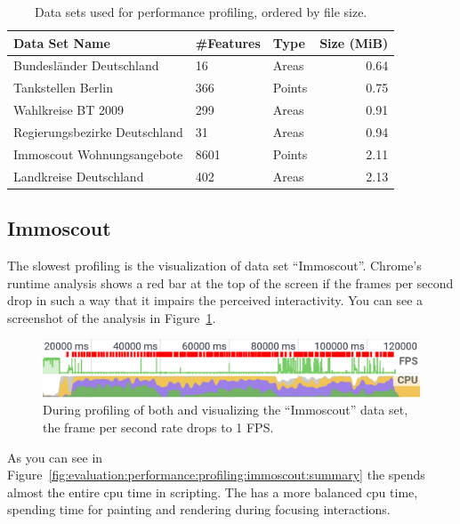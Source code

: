 \begin{table}[ht]
  \centering
  \caption{Data sets used for performance profiling, ordered by file size.}%
  \label{tab:evaluation:performance:data-sets}
  \begin{tabular}{lllr}
    Data Set Name & \#Features & Type & Size (MiB) \\
    \hline
    Bundesländer Deutschland      & 16   & Areas  & 0.64 \\
    Tankstellen Berlin            & 366  & Points & 0.75 \\
    Wahlkreise BT 2009            & 299  & Areas  & 0.91 \\
    Regierungsbezirke Deutschland & 31   & Areas  & 0.94 \\
    Immoscout Wohnungsangebote    & 8601 & Points & 2.11 \\
    Landkreise Deutschland        & 402  & Areas  & 2.13 \\
  \end{tabular}
\end{table}


\subsection{Immoscout}
The slowest profiling is the visualization of data set ``Immoscout''.
Chrome's runtime analysis shows a red bar at the top of the screen if the frames per second drop in such a way that it impairs the perceived interactivity.
You can see a screenshot of the analysis in Figure~\ref{fig:evaluation:performance:profiling:immoscout:fps}.


\begin{figure}[ht]
  \centering
  \includegraphics[width=\textwidth]{figures/evaluation/performance/profiles/immoscout_both/fps}
  \caption{During profiling of both \tmap{} and \gv{} visualizing the ``Immoscout'' data set, the frame per second rate drops to 1 FPS.}
  \label{fig:evaluation:performance:profiling:immoscout:fps}
\end{figure}

As you can see in Figure~\ref{fig:evaluation:performance:profiling:immoscout:summary} the \tmap{} spends almost the entire \gls{cpu} time in scripting.
The \gv{} has a more balanced \gls{cpu} time, spending time for painting and rendering during focusing interactions.

